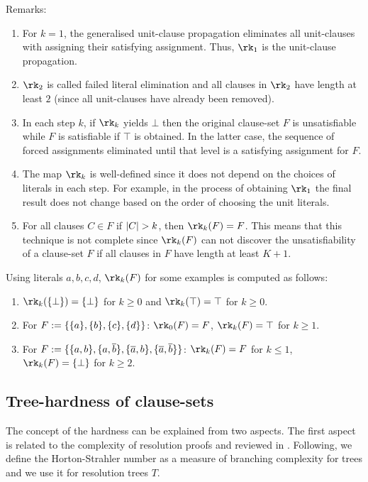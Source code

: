 \documentclass{report}
\begin{document}
Remarks:
\begin{enumerate}
  \item For $k=1$, the generalised unit-clause propagation eliminates all unit-clauses with assigning their satisfying assignment. Thus, $\rk_1$ is the unit-clause propagation.
  \item $\rk_2$ is called failed literal elimination and all clauses in $\rk_2$ have length at least $2$ (since all unit-clauses have already been removed).
  \item In each step $k$, if $\rk_k$ yields $\bot$ then the original clause-set $F$ is unsatisfiable while $F$ is satisfiable if $\top$ is obtained. In the latter case, the sequence of forced assignments eliminated until that level is a satisfying assignment for $F$.
  \item The map $\rk_k$ is well-defined since it does not depend on the choices of literals in each step. For example, in the process of obtaining  $\rk_1$ the final result does not change based on the order of choosing the unit literals. 
  \item For all clauses $C \in F$ if $\lvert C \rvert > k$, then $\rk_k(F) = F$. This means that this technique is not complete since $\rk_k(F)$ can not discover the unsatisfiability of a clause-set $F$ if all clauses in $F$ have length at least $K+1$.
\end{enumerate}

\begin{examp}\label{exp:rk}
Using literals $a,b,c,d$, $\rk_k(F)$ for some examples is computed as follows:
  \begin{enumerate}
  \item $\rk_k(\set{\bot}) = \set{\bot}$ for $k \ge 0$ and $\rk_k(\top) = \top$ for $k \ge 0$.
  \item For $F := \{ \{ a \},\{ b \},\{ c \},\{ d \} \}$: $\rk_0(F) = F$, $\rk_k(F) = \top$ for $k \ge 1$.
  \item For $F := \{ \{ a,b \},\{ a,\overline{b} \}, \{ \overline{a},b \},\{ \overline{a},\overline{b} \} \}$: $\rk_k(F) = F$ for $k \le 1$, $\rk_k(F) = \set{\bot}$ for $k \ge 2$.
  \end{enumerate}
\end{examp}
\subsection{Tree-hardness of clause-sets}
\label{sec:Hardnessunsat}

The concept of the hardness can be explained from two aspects. The first aspect is related to the complexity of resolution proofs and reviewed in \cite{h8, h18}. Following, we define the Horton-Strahler number as a measure of branching complexity for trees and we use it for resolution trees $T$.
\end{document}
